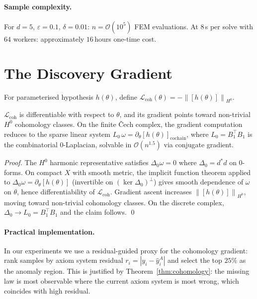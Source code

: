 \documentclass[twoside,11pt]{article}
\newcommand{\norm}[1]{\left\lVert#1\right\rVert}
\begin{document}
\paragraph{Sample complexity.}
For $d = 5$, $\varepsilon = 0.1$, $\delta = 0.01$:
$n = \mathcal{O}(10^5)$ FEM evaluations. At $8$\,s per solve with
$64$ workers: approximately $16$\,hours one-time cost.

\section{The Discovery Gradient}
\label{sec:gradient}

\begin{definition}
For parameterised hypothesis $h(\theta)$, define
$\mathcal{L}_{\mathrm{coh}}(\theta)
= -\norm{[h(\theta)]}_{H^0}$.
\end{definition}

\begin{theorem}[Differentiability]
\label{thm:gradient}
$\mathcal{L}_{\mathrm{coh}}$ is differentiable with respect to
$\theta$, and its gradient points toward non-trivial $H^0$
cohomology classes. On the finite \v{C}ech complex, the gradient
computation reduces to the sparse linear system
$L_0\,\omega = \partial_\theta[h(\theta)]_{\mathrm{cochain}}$,
where $L_0 = B_1^\top B_1$ is the combinatorial $0$-Laplacian,
solvable in $\mathcal{O}(n^{1.5})$ via conjugate gradient.
\end{theorem}

\begin{proof}
The $H^0$ harmonic representative satisfies $\Delta_0 \omega = 0$
where $\Delta_0 = d^*d$ on $0$-forms. On compact $X$ with smooth
metric, the implicit function theorem applied to $\Delta_0\omega =
\partial_\theta[h(\theta)]$ (invertible on $(\ker\Delta_0)^\perp$)
gives smooth dependence of $\omega$ on $\theta$, hence
differentiability of $\mathcal{L}_{\mathrm{coh}}$. Gradient ascent
increases $\norm{[h(\theta)]}_{H^0}$, moving toward non-trivial
cohomology classes. On the discrete complex,
$\Delta_0 \to L_0 = B_1^\top B_1$ and the claim follows. \qed
\end{proof}

\paragraph{Practical implementation.}
In our experiments we use a residual-guided proxy for the cohomology
gradient: rank samples by axiom system residual
$r_i = |y_i - \hat{y}^A_i|$ and select the top $25\%$ as the
anomaly region. This is justified by Theorem~\ref{thm:cohomology}:
the missing law is most observable where the current axiom system is
most wrong, which coincides with high residual.
\end{document}
